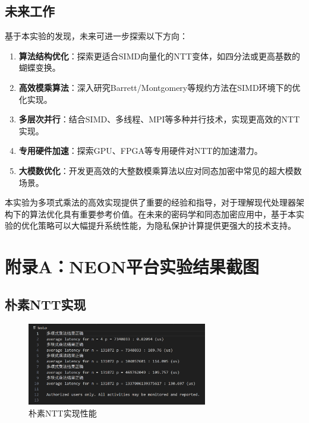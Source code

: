 \documentclass[a4paper,colorlinks=true,linkcolor=blue,urlcolor=blue,citecolor=green,bookmarks=true]{article}
\begin{document}
\subsection{未来工作}
基于本实验的发现，未来可进一步探索以下方向：

\begin{enumerate}
  \item \textbf{算法结构优化}：探索更适合SIMD向量化的NTT变体，如四分法或更高基数的蝴蝶变换。
  \item \textbf{高效模乘算法}：深入研究Barrett/Montgomery等规约方法在SIMD环境下的优化实现。
  \item \textbf{多层次并行}：结合SIMD、多线程、MPI等多种并行技术，实现更高效的NTT实现。
  \item \textbf{专用硬件加速}：探索GPU、FPGA等专用硬件对NTT的加速潜力。
  \item \textbf{大模数优化}：开发更高效的大整数模乘算法以应对同态加密中常见的超大模数场景。
\end{enumerate}

本实验为多项式乘法的高效实现提供了重要的经验和指导，对于理解现代处理器架构下的算法优化具有重要参考价值。在未来的密码学和同态加密应用中，基于本实验的优化策略可以大幅提升系统性能，为隐私保护计算提供更强大的技术支持。

\clearpage
{}
{}
\renewcommand{\bibname}{参考文献}
\nocite{*} %


\clearpage
{}
\appendix
{}
\section*{附录A：NEON平台实验结果截图}
\renewcommand{\thesubsection}{A.\arabic{subsection}}

\setcounter{figure}{0}
\renewcommand{\thefigure}{A.\arabic{figure}}

\subsection{朴素NTT实现}
\begin{figure}[H]
  \centering
  \includegraphics[width=0.7\textwidth]{ntt.png}
  \caption{朴素NTT实现性能}
  \label{fig:ntt_screenshot}
\end{figure}
\end{document}
